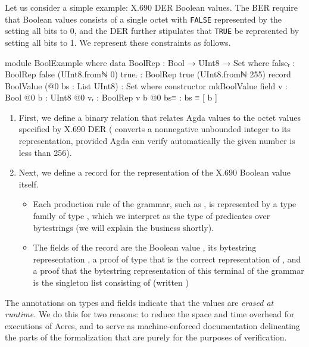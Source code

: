 \documentclass[11pt]{article}
\begin{document}
Let us consider a simple example: X.690 DER Boolean values.
The BER require that Boolean values consists of a single octet
with \texttt{FALSE} represented by the setting all bits to 0, and the DER further
stipulates that \texttt{TRUE} be represented by setting all bits to 1.
We represent these constraints as follows.

\begin{code}
module BoolExample where
  data BoolRep : Bool → UInt8 → Set where
    falseᵣ : BoolRep false (UInt8.fromℕ 0)
    trueᵣ  : BoolRep true (UInt8.fromℕ 255)
  record BoolValue (@0 bs : List UInt8) : Set where
    constructor mkBoolValue
    field
      v     : Bool
      @0 b  : UInt8
      @0 vᵣ : BoolRep v b
      @0 bs≡ : bs ≡ [ b ]
\end{code}

\begin{enumerate}
\item First, we define a binary relation  that relates Agda
 values to the octet values specified by X.690 DER
( converts a nonnegative unbounded integer to its
 representation, provided Agda can verify automatically
the given number is less than 256).

\item Next, we define a record  for the representation of
the X.690 Boolean value itself.

\begin{itemize}
\item Each production rule of the grammar, such as , is
represented by a type family of type
\AgdaSpace{}\AgdaSpace{}\AgdaSpace{}\AgdaSpace{},
which we interpret as the type of predicates over bytestrings (we will
explain the  business shortly).

\item The fields of the record are the Boolean value , its
bytestring representation , a proof of type
\AgdaSpace{}\AgdaSpace{}
that  is the correct representation of , and a
proof that the bytestring representation of this terminal of the grammar
is the singleton list consisting of  (written \AgdaFunction{[}\AgdaSpace{}\AgdaSpace{}\AgdaFunction{]})
\end{itemize}
\end{enumerate}


The  annotations on types and fields indicate that
the values are \emph{erased at runtime.}
We do this for two reasons: to reduce the space and time overhead for
executions of Aeres, and to serve as machine-enforced documentation
delineating the parts of the formalization that are purely for the purposes of
verification.
\end{document}
